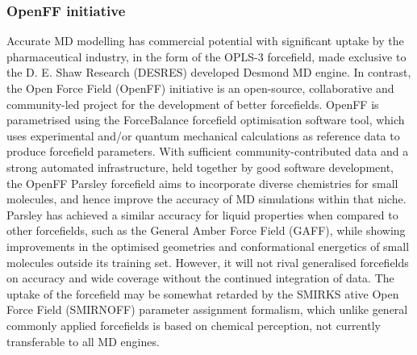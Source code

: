 \subsubsection{OpenFF initiative}
Accurate MD modelling has commercial potential with significant uptake by the pharmaceutical industry, in the form of the OPLS-3 forcefield,\cite{harder2016opls3} made exclusive to the D. E. Shaw Research (DESRES) developed Desmond MD engine.\cite{bowers2006scalable} In contrast, the Open Force Field (OpenFF) initiative is an open-source, collaborative and community-led project for the development of better forcefields.\cite{Qiu2020} OpenFF is parametrised using the ForceBalance forcefield optimisation software tool,\cite{wang2013systematic} which uses experimental and/or quantum mechanical calculations as reference data to produce forcefield parameters. With sufficient community-contributed data and a strong automated infrastructure, held together by good software development, the OpenFF Parsley forcefield aims to incorporate diverse chemistries for small molecules, and hence improve the accuracy of MD simulations within that niche. Parsley has achieved a similar accuracy for liquid properties when compared to other forcefields, such as the General Amber Force Field (GAFF), while showing improvements in the optimised geometries and conformational energetics of small molecules outside its training set.\cite{Qiu2020} However, it will not rival generalised forcefields on accuracy and wide coverage without the continued integration of data. The uptake of the forcefield may be somewhat retarded by the SMIRKS \cite{SMIRKS} ative Open Force Field (SMIRNOFF) parameter assignment formalism, which unlike general commonly applied forcefields is based on chemical perception,  not currently transferable to all MD engines. 

